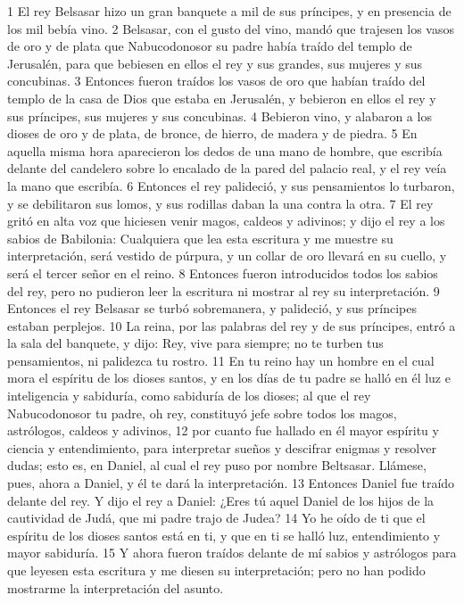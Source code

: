 1 El rey Belsasar hizo un gran banquete a mil de sus príncipes, y en presencia de los mil bebía vino.
2 Belsasar, con el gusto del vino, mandó que trajesen los vasos de oro y de plata que Nabucodonosor su padre había traído del templo de Jerusalén, para que bebiesen en ellos el rey y sus grandes, sus mujeres y sus concubinas.
3 Entonces fueron traídos los vasos de oro que habían traído del templo de la casa de Dios que estaba en Jerusalén, y bebieron en ellos el rey y sus príncipes, sus mujeres y sus concubinas.
4 Bebieron vino, y alabaron a los dioses de oro y de plata, de bronce, de hierro, de madera y de piedra.
5 En aquella misma hora aparecieron los dedos de una mano de hombre, que escribía delante del candelero sobre lo encalado de la pared del palacio real, y el rey veía la mano que escribía.
6 Entonces el rey palideció, y sus pensamientos lo turbaron, y se debilitaron sus lomos, y sus rodillas daban la una contra la otra.
7 El rey gritó en alta voz que hiciesen venir magos, caldeos y adivinos; y dijo el rey a los sabios de Babilonia: Cualquiera que lea esta escritura y me muestre su interpretación, será vestido de púrpura, y un collar de oro llevará en su cuello, y será el tercer señor en el reino.
8 Entonces fueron introducidos todos los sabios del rey, pero no pudieron leer la escritura ni mostrar al rey su interpretación. 
9 Entonces el rey Belsasar se turbó sobremanera, y palideció, y sus príncipes estaban perplejos.
10 La reina, por las palabras del rey y de sus príncipes, entró a la sala del banquete, y dijo: Rey, vive para siempre; no te turben tus pensamientos, ni palidezca tu rostro. 
11 En tu reino hay un hombre en el cual mora el espíritu de los dioses santos, y en los días de tu padre se halló en él luz e inteligencia y sabiduría, como sabiduría de los dioses; al que el rey Nabucodonosor tu padre, oh rey, constituyó jefe sobre todos los magos, astrólogos, caldeos y adivinos,
12 por cuanto fue hallado en él mayor espíritu y ciencia y entendimiento, para interpretar sueños y descifrar enigmas y resolver dudas; esto es, en Daniel, al cual el rey puso por nombre Beltsasar. Llámese, pues, ahora a Daniel, y él te dará la interpretación.
13 Entonces Daniel fue traído delante del rey. Y dijo el rey a Daniel: ¿Eres tú aquel Daniel de los hijos de la cautividad de Judá, que mi padre trajo de Judea?
14 Yo he oído de ti que el espíritu de los dioses santos está en ti, y que en ti se halló luz, entendimiento y mayor sabiduría.
15 Y ahora fueron traídos delante de mí sabios y astrólogos para que leyesen esta escritura y me diesen su interpretación; pero no han podido mostrarme la interpretación del asunto.
